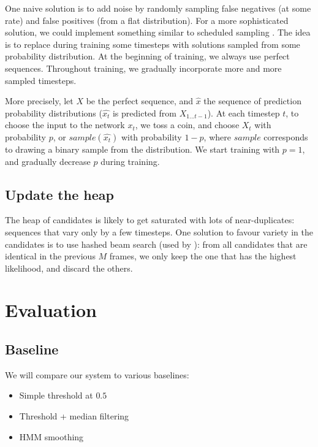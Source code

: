\documentclass{article}
\begin{document}
One naive solution is to add noise by randomly sampling false negatives (at some rate) and false positives (from a flat distribution).
For a more sophisticated solution, we could implement something similar to scheduled sampling  \citep{Bengio2015}.
The idea is to replace during training some timesteps with solutions sampled from some probability distribution.
At the beginning of training, we always use perfect sequences.
Throughout training, we gradually incorporate more and more sampled timesteps.

More precisely, let $X$ be the perfect sequence, and $\hat{x}$ the sequence of prediction probability distributions
($\hat{x_t}$ is predicted from $X_{1...t-1}$).
At each timestep $t$, to choose the input to the network $x_t$, we toss a coin,
and choose $X_t$ with probability $p$, or $sample(\hat{x_t})$ with probability $1-p$, where $sample$ corresponds to drawing a binary sample from the distribution.
We start training with $p=1$, and gradually decrease $p$ during training.



\subsection{Update the heap}
\label{sec:update}

The heap of candidates is likely to get saturated with lots of near-duplicates: sequences that vary only by a few timesteps.
One solution to favour variety in the candidates is to use hashed beam search (used by \citep{Korzeniowski2018}):
from all candidates that are identical in the previous $M$ frames, we only keep the one that has the highest likelihood, and discard the others.


\section{Evaluation}

\subsection{Baseline}

We will compare our system to various baselines:

\begin{itemize}
\item Simple threshold at $0.5$
\item Threshold + median filtering
\item HMM smoothing \citep{Poliner2006}
\end{itemize}
\end{document}
